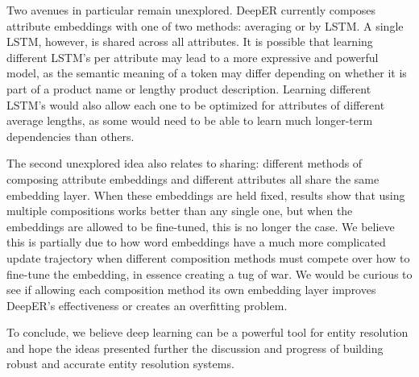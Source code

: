 \documentclass{proc}
\begin{document}
Two avenues in particular remain unexplored. DeepER currently composes attribute embeddings with one of two methods: averaging or by LSTM. A single LSTM, however, is shared across all attributes. It is possible that learning different LSTM's per attribute may lead to a more expressive and powerful model, as the semantic meaning of a token may differ depending on whether it is part of a product name or lengthy product description. Learning different LSTM's would also allow each one to be optimized for attributes of different average lengths, as some would need to be able to learn much longer-term dependencies than others.

The second unexplored idea also relates to sharing: different methods of composing attribute embeddings and different attributes all share the same embedding layer. When these embeddings are held fixed, results show that using multiple compositions works better than any single one, but when the embeddings are allowed to be fine-tuned, this is no longer the case. We believe this is partially due to how word embeddings have a much more complicated update trajectory when different composition methods must compete over how to fine-tune the embedding, in essence creating a tug of war. We would be curious to see if allowing each composition method its own embedding layer improves DeepER's effectiveness or creates an overfitting problem.

To conclude, we believe deep learning can be a powerful tool for entity resolution and hope the ideas presented further the discussion and progress of building robust and accurate entity resolution systems.



\end{document}
